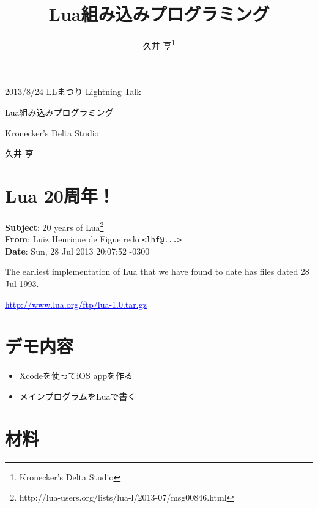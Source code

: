 \documentclass[slide,papersize]{jsarticle}
\newcommand{\link}[1]{\textcolor[named]{Blue}{\underline{#1}}}
\begin{document}
\title{Lua組み込みプログラミング}
\author{久井 亨\thanks{Kronecker's Delta Studio}}


\begin{flushright}
 {\small 2013/8/24 LLまつり Lightning Talk}
\end{flushright}

\vspace*{0.8cm}
\begin{center}
 {\Large Lua組み込みプログラミング}

\vspace*{0.3cm}

Kronecker's Delta Studio

\vspace*{0.1cm}

{\large 久井 亨}

\end{center}


\section*{Lua 20周年！}


{\scriptsize
\textbf{Subject}: 20 years of Lua\footnote{http://lua-users.org/lists/lua-l/2013-07/msg00846.html}\\
\textbf{From}: Luiz Henrique de Figueiredo \texttt{<lhf@...>}\\
\textbf{Date}: Sun, 28 Jul 2013 20:07:52 -0300\\
}


\begin{center}
The earliest implementation of Lua that we have found to date has files
dated 28 Jul 1993.

\vspace*{0.2cm}

\link{http://www.lua.org/ftp/lua-1.0.tar.gz}
\end{center}


\section*{デモ内容}

\begin{itemize}
 \item Xcodeを使ってiOS appを作る
 \item メインプログラムをLuaで書く
\end{itemize}


\section*{材料}
\end{document}
